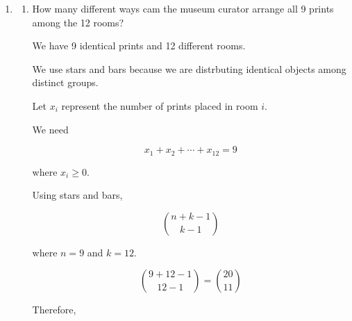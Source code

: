 \documentclass{article}
\begin{document}
\begin{enumerate}
\begin{enumerate}
For example,

\[
(10,0,0,0,0,0,0)
\]

\[
(0,10,0,0,0,0,0)
\]

\[
\vdots
\]

There are exactly 7 invalid cases, one for each possible position of 10. We subtract these cases:

\[
\boxed{
\binom{16}{6}-7
}
\]

\item How many 7 character license plates contain only letters in alphabetical order, with repitions allowed?

We use combination with repition:

\[
\binom {n+k-1}{k}
\]

where 
\[
n = 26 \text { letters}
\]

\[
k = 7 \text { characters}
\]

Because the letters must appear in alphabetical order, each selection of 7 letters corresponds to
exactly one valid license plate.

Substituting

\[
\binom{26+7-1}{7}
=
\binom{32}{7}
\]

Therefore, 

\[
\boxed{
\binom{32}{7}
}
\]

\end{enumerate}

\item
\begin{enumerate}

\item How many different ways cam the museum curator arrange all 9 prints among the 12 rooms?

We have 9 identical prints and 12 different rooms.

We use stars and bars because we are distrbuting identical objects among distinct groups.

Let $x_i$ represent the number of prints placed in room $i$. 

We need

\[
x_1 + x_2 + \cdots + x_{12} = 9
\]

where $x_i \geq 0$.

Using stars and bars, 

\[
\binom{n+k-1}{k-1}
\]

where $n=9$ and $k=12$.

\[
\binom{9+12-1}{12-1}
=
\binom{20}{11}
\]

Therefore,


\end{enumerate}
\end{enumerate}
\end{document}
